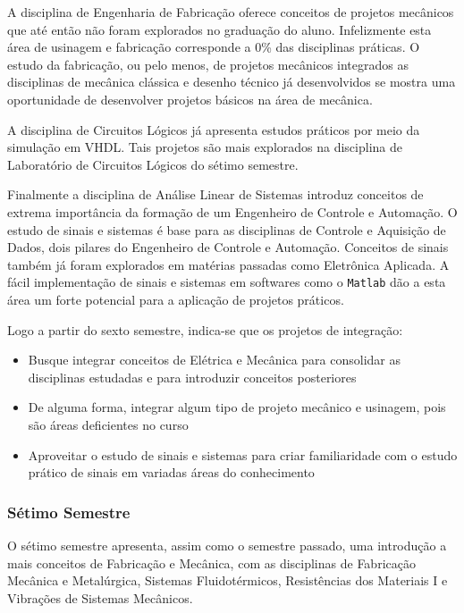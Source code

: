 \documentclass[12pt]{article} %
\begin{document}
A disciplina de Engenharia de Fabricação oferece conceitos de projetos mecânicos que até então não foram explorados no graduação do aluno. Infelizmente esta área de usinagem e fabricação corresponde a 0\% das disciplinas práticas. O estudo da fabricação, ou pelo menos, de projetos mecânicos integrados as disciplinas de mecânica clássica e desenho técnico já desenvolvidos se mostra uma oportunidade de desenvolver projetos básicos na área de mecânica.

A disciplina de Circuitos Lógicos já apresenta estudos práticos por meio da simulação em VHDL. Tais projetos são mais explorados na disciplina de Laboratório de Circuitos Lógicos do sétimo semestre. 

Finalmente a disciplina de Análise Linear de Sistemas introduz conceitos de extrema importância da formação de um Engenheiro de Controle e Automação. O estudo de sinais e sistemas é base para as disciplinas de Controle e Aquisição de Dados, dois pilares do Engenheiro de Controle e Automação. Conceitos de sinais também já foram explorados em matérias passadas como Eletrônica Aplicada. A fácil implementação de sinais e sistemas em softwares como o \texttt{Matlab} dão a esta área um forte potencial para a aplicação de projetos práticos.

Logo a partir do sexto semestre, indica-se que os projetos de integração:

\begin{itemize}
\item Busque integrar conceitos de Elétrica e Mecânica para consolidar as disciplinas estudadas e para introduzir conceitos posteriores
\item De alguma forma, integrar algum tipo de projeto mecânico e usinagem, pois são áreas deficientes no curso
\item Aproveitar o estudo de sinais e sistemas para criar familiaridade com o estudo prático de sinais em variadas áreas do conhecimento
\end{itemize}

\subsubsection{Sétimo Semestre}

O sétimo semestre apresenta, assim como o semestre passado, uma introdução a mais conceitos de Fabricação e Mecânica, com as disciplinas de Fabricação Mecânica e Metalúrgica, Sistemas Fluidotérmicos, Resistências dos Materiais I e Vibrações de Sistemas Mecânicos.
\end{document}

